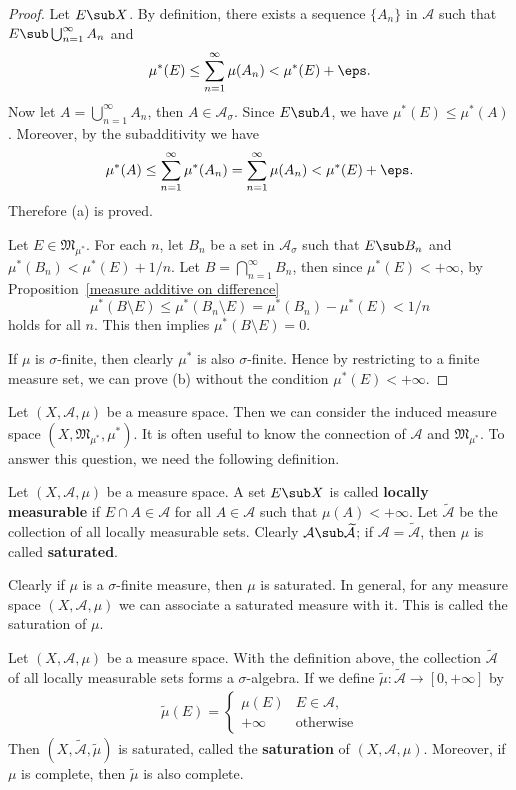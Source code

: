 \begin{proof}
Let $E\sub X$. By definition, there exists a sequence $\{A_n\}$ in $\mathcal{A}$ such that $E\sub\bigcup_{n=1}^{\infty}A_n$ and
\[\mu^*(E)\leq\sum_{n=1}^{\infty}\mu(A_n)<\mu^*(E)+\eps.\]
Now let $A=\bigcup_{n=1}^{\infty}A_n$, then $A\in\mathcal{A}_\sigma$. Since $E\sub A$, we have $\mu^*(E)\leq\mu^*(A)$. Moreover, by the subadditivity we have
\[\mu^*(A)\leq\sum_{n=1}^{\infty}\mu^*(A_n)=\sum_{n=1}^{\infty}\mu(A_n)<\mu^*(E)+\eps.\]
Therefore (a) is proved.\par
Let $E\in\mathfrak{M}_{\mu^*}$. For each $n$, let $B_n$ be a set in $\mathcal{A}_\sigma$ such that $E\sub B_n$ and $\mu^*(B_n)<\mu^*(E)+1/n$. Let $B=\bigcap_{n=1}^{\infty}B_n$, then since $\mu^*(E)<+\infty$, by Proposition~\ref{measure additive on difference} 
\[\mu^*(B\setminus E)\leq\mu^*(B_n\setminus E)=\mu^*(B_n)-\mu^*(E)<1/n\]
holds for all $n$. This then implies $\mu^*(B\setminus E)=0$.\par
If $\mu$ is $\sigma$-finite, then clearly $\mu^*$ is also $\sigma$-finite. Hence by restricting to a finite measure set, we can prove (b) without the condition $\mu^*(E)<+\infty$.
\end{proof}
Let $(X,\mathcal{A},\mu)$ be a measure space. Then we can consider the induced measure space $(X,\mathfrak{M}_{\mu^*},\mu^*)$. It is often useful to know the connection of $\mathcal{A}$ and $\mathfrak{M}_{\mu^*}$. To answer this question, we need the following definition.
\begin{definition}
Let $(X,\mathcal{A},\mu)$ be a measure space. A set $E\sub X$ is called \textbf{locally measurable} if $E\cap A\in\mathcal{A}$ for all $A\in\mathcal{A}$ such that $\mu(A)<+\infty$. Let $\widetilde{\mathcal{A}}$ be the collection of all locally measurable sets. Clearly $\mathcal{A}\sub\widetilde{\mathcal{A}}$; if $\mathcal{A}=\widetilde{\mathcal{A}}$, then $\mu$ is called \textbf{saturated}.
\end{definition}
Clearly if $\mu$ is a $\sigma$-finite measure, then $\mu$ is saturated. In general, for any measure space $(X,\mathcal{A},\mu)$ we can associate a saturated measure with it. This is called the saturation of $\mu$.
\begin{proposition}\label{measure saturation}
Let $(X,\mathcal{A},\mu)$ be a measure space. With the definition above, the collection $\widetilde{\mathcal{A}}$ of all locally measurable sets forms a $\sigma$-algebra. If we define $\widetilde{\mu}:\widetilde{\mathcal{A}}\to[0,+\infty]$ by
\begin{align}\label{measure saturation-1}
\widetilde{\mu}(E)=\begin{cases}
\mu(E)&E\in\mathcal{A},\\
+\infty&\text{otherwise}
\end{cases}
\end{align}
Then $(X,\widetilde{\mathcal{A}},\widetilde{\mu})$ is saturated, called the \textbf{saturation} of $(X,\mathcal{A},\mu)$. Moreover, if $\mu$ is complete, then $\widetilde{\mu}$ is also complete.
\end{proposition}
